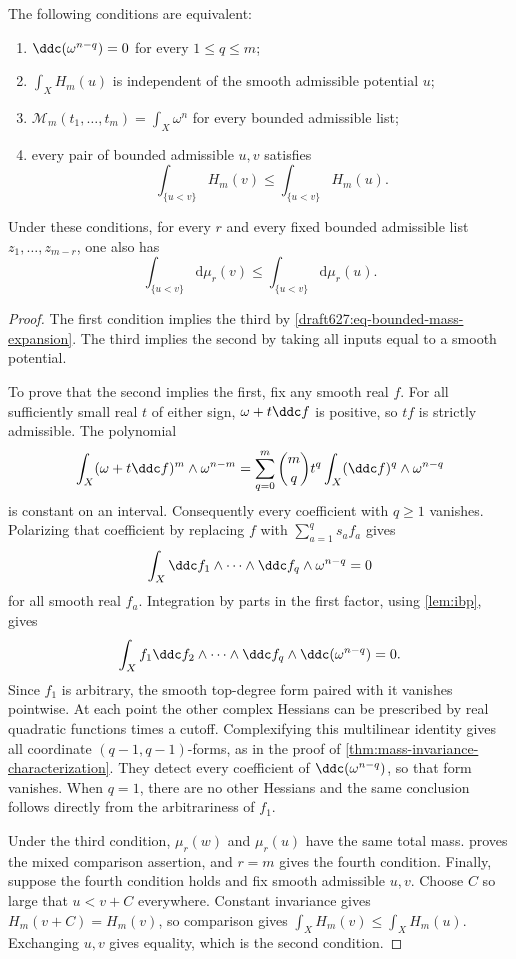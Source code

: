 \begin{theorem}\label{draft627:global-comparison-characterization}
The following conditions are equivalent:
\begin{enumerate}
\item $\ddc(\omega^{n-q})=0$ for every $1\leq q\leq m$;
\item $\int_XH_m(u)$ is independent of the smooth admissible
      potential $u$;
\item $\mathcal M_m(t_1,\ldots,t_m)=\int_X\omega^n$ for every
      bounded admissible list;
\item every pair of bounded admissible $u,v$ satisfies
\[
 \int_{\{u<v\}}H_m(v)\leq\int_{\{u<v\}}H_m(u).
\]
\end{enumerate}
Under these conditions, for every $r$ and every fixed bounded
admissible list $z_1,\ldots,z_{m-r}$, one also has
\[
 \int_{\{u<v\}}\mathrm d\mu_r(v)
           \leq\int_{\{u<v\}}\mathrm d\mu_r(u).
\]
\end{theorem}
\begin{proof}
The first condition implies the third by
\eqref{draft627:eq-bounded-mass-expansion}. The third implies the
second by taking all inputs equal to a smooth potential.

To prove that the second implies the first, fix any smooth real
$f$. For all sufficiently small real $t$ of either sign,
$\omega+t\ddc f$ is positive, so $tf$ is strictly admissible.
The polynomial
\[
 \int_X(\omega+t\ddc f)^m\wedge\omega^{n-m}
 =\sum_{q=0}^m\binom mq t^q
              \int_X(\ddc f)^q\wedge\omega^{n-q}
\]
is constant on an interval. Consequently every coefficient with
$q\geq1$ vanishes. Polarizing that coefficient by replacing $f$
with $\sum_{a=1}^q s_af_a$ gives
\[
 \int_X\ddc f_1\wedge\cdots\wedge\ddc f_q
                        \wedge\omega^{n-q}=0
\]
for all smooth real $f_a$. Integration by parts in the first
factor, using \cref{lem:ibp}, gives
\[
 \int_Xf_1\ddc f_2\wedge\cdots\wedge\ddc f_q
                         \wedge\ddc(\omega^{n-q})=0.
\]
Since $f_1$ is arbitrary, the smooth top-degree form paired with
it vanishes pointwise. At each point the other complex Hessians
can be prescribed by real quadratic functions times a cutoff.
Complexifying this multilinear identity gives all coordinate
$(q-1,q-1)$-forms, as in the proof of
\cref{thm:mass-invariance-characterization}. They detect every
coefficient of $\ddc(\omega^{n-q})$, so that form vanishes. When
$q=1$, there are no other Hessians and the same conclusion follows
directly from the arbitrariness of $f_1$.

Under the third condition, $\mu_r(w)$ and $\mu_r(u)$ have the same
total mass.  proves the mixed
comparison assertion, and $r=m$ gives the fourth condition.
Finally, suppose the fourth condition holds and fix smooth admissible
$u,v$. Choose $C$ so large that $u<v+C$ everywhere.
Constant invariance gives $H_m(v+C)=H_m(v)$, so comparison gives
$\int_XH_m(v)\leq\int_XH_m(u)$. Exchanging $u,v$ gives equality,
which is the second condition.
\end{proof}

